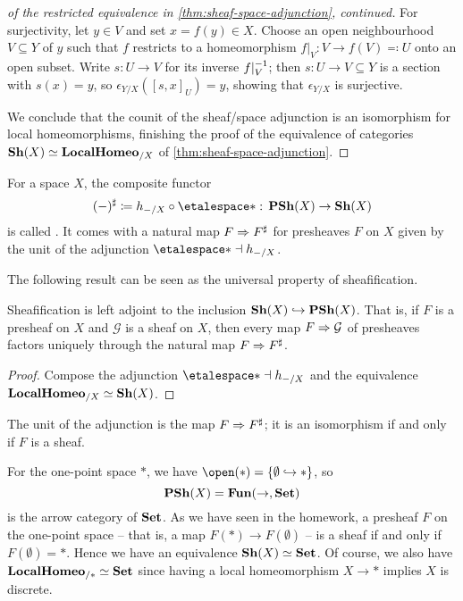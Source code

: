 \begin{proof}[of the restricted equivalence in \cref{thm:sheaf-space-adjunction}, continued]
For surjectivity, let \(y\in V\) and set \(x=f(y)\in X\).
Choose an open neighbourhood \(V\subseteq Y\) of \(y\) such that \(f\) restricts to a homeomorphism \(f|_V\colon V\to f(V) \eqcolon U\) onto an open subset.
Write \(s\colon U\to V\) for its inverse \(f|_V^{-1}\); then \(s\colon U\to V\subseteq Y\) is a section with \(s(x)=y\), so \(\epsilon_{Y/X}([s,x]_U)=y\), showing that \(\epsilon_{Y/X}\) is surjective.

We conclude that the counit of the sheaf/space adjunction is an isomorphism for local homeomorphisms, finishing the proof of the equivalence of categories \(\operatorname{\mathbf{Sh}}(X)\simeq\mathbf{LocalHomeo}_{/X}\) of \cref{thm:sheaf-space-adjunction}.
\end{proof}

\begin{defn}
For a space $X$, the composite functor
\[ (-)^\sharp \coloneq h_{-/X} \circ \etalespace* \colon \catPresheaf(X)\to\catSheaf(X) \]
is called .
It comes with a natural map $F\Rightarrow F^\sharp$ for presheaves $F$ on $X$ given by the unit of the adjunction $\etalespace*\leftadj h_{-/X}$.
\end{defn}

The following result can be seen as the universal property of sheafification.

\begin{cor}\label{cor:sheafification-left-adjoint-to-inclusion}
Sheafification is left adjoint to the inclusion $\operatorname{\mathbf{Sh}}(X)\hookrightarrow\operatorname{\mathbf{PSh}}(X)$.
That is, if $F$ is a presheaf on $X$ and $\mathcal G$ is a sheaf on $X$, then every map $F\Rightarrow \mathcal G$ of presheaves factors uniquely through the natural map $F\Rightarrow F^\sharp$.
\end{cor}
\begin{proof}
Compose the adjunction $\etalespace*\leftadj h_{-/X}$ and the equivalence $\mathbf{LocalHomeo}_{/X}\simeq\operatorname{\mathbf{Sh}}(X)$.
\end{proof}

The unit of the adjunction is the map $F\Rightarrow F^\sharp$; it is an isomorphism if and only if $F$ is a sheaf.

\begin{exmp}\label{exmp:sheaf-on-point-set}
For the one-point space $*$, we have $\open(*) = \{\emptyset\hookrightarrow *\}$, so
\[ \operatorname{\mathbf{PSh}}(X) = \operatorname{\mathbf{Fun}}(\mathord{\to},\mathbf{Set}) \]
is the arrow category of $\mathbf{Set}$.
As we have seen in the homework, a presheaf $F$ on the one-point space -- that is, a map $F(*)\to F(\emptyset)$ -- is a sheaf if and only if $F(\emptyset)=*$.
Hence we have an equivalence $\operatorname{\mathbf{Sh}}(X)\simeq\mathbf{Set}$.
Of course, we also have $\mathbf{LocalHomeo}_{/*} \simeq\mathbf{Set}$ since having a local homeomorphism $X\to *$ implies $X$ is discrete.
\end{exmp}

